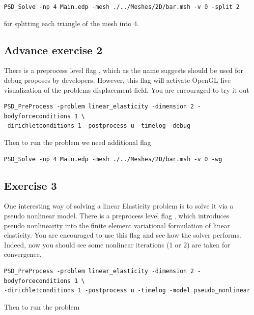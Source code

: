 \begin{lstlisting}[style=BashInputStyle]
PSD_Solve -np 4 Main.edp -mesh ./../Meshes/2D/bar.msh -v 0 -split 2
\end{lstlisting}

for splitting each triangle of the mesh  into 4.

\subsection{Advance exercise  2}

There is a preprocess level flag , which as the name
suggests should be used for debug proposes by developers. However, this
flag will activate OpenGL live visualization of the problems
displacement field. You are encouraged to try it out

\begin{lstlisting}[style=BashInputStyle]
PSD_PreProcess -problem linear_elasticity -dimension 2 -bodyforceconditions 1 \
-dirichletconditions 1 -postprocess u -timelog -debug
\end{lstlisting}

Then to run the problem we need additional  flag

\begin{lstlisting}[style=BashInputStyle]
PSD_Solve -np 4 Main.edp -mesh ./../Meshes/2D/bar.msh -v 0 -wg
\end{lstlisting}

\subsection{Exercise  3}

One interesting way of solving a linear Elasticity problem is to solve
it via a pseudo nonlinear model. There is a preprocess level flag
\psd{-model pseudo\_nonlinear}, which introduces pseudo nonlinearity
into the finite element variational formulation of linear elasticity.
You are encouraged to use this flag and see how the solver performs.
Indeed, now you should see some nonlinear iterations (1 or 2) are taken
for convergence.

\begin{lstlisting}[style=BashInputStyle]
PSD_PreProcess -problem linear_elasticity -dimension 2 -bodyforceconditions 1 \
-dirichletconditions 1 -postprocess u -timelog -model pseudo_nonlinear
\end{lstlisting}

Then to run the problem

